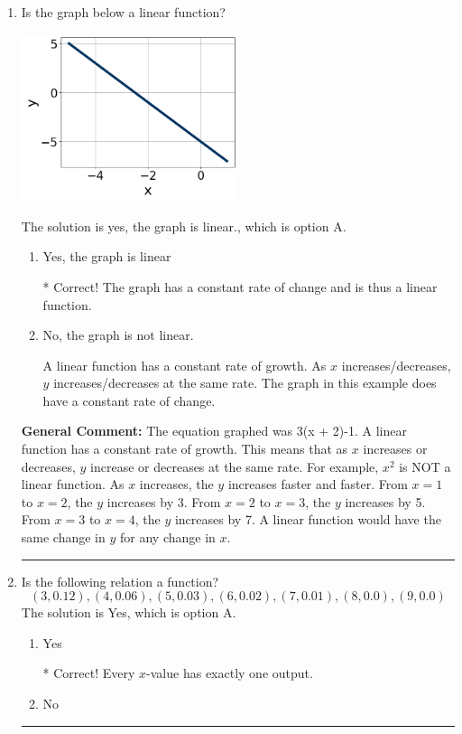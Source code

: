 \documentclass{extbook}[14pt]
\newcommand{\litem}[1]{\item #1

\rule{\textwidth}{0.4pt}}
\begin{document}
\begin{enumerate}\litem{
Is the graph below a linear function?

\begin{center}
    \includegraphics[width=0.5\textwidth]{../Figures/MA_8_F_1_2_graphD.png}
\end{center}


The solution is yes, the graph is linear., which is option A.

\begin{enumerate}[label=\Alph*.]
\item Yes, the graph is linear

* Correct! The graph has a constant rate of change and is thus a linear function.
\item No, the graph is not linear.

A linear function has a constant rate of growth. As $x$ increases/decreases, $y$ increases/decreases at the same rate. The graph in this example does have a constant rate of change.
\end{enumerate}


\textbf{General Comment:} The equation graphed was 3(x + 2)-1. A linear function has a constant rate of growth. This means that as $x$ increases or decreases, $y$ increase or decreases at the same rate. For example, $x^2$ is NOT a linear function. As $x$ increases, the $y$ increases faster and faster. From $x=1$ to $x=2$, the $y$ increases by 3. From $x=2$ to $x=3$, the $y$ increases by 5. From $x=3$ to $x=4$, the $y$ increases by 7. A linear function would have the same change in $y$ for any change in $x$.
}
\litem{
Is the following relation a function?
\[ (3, 0.12), (4, 0.06), (5, 0.03), (6, 0.02), (7, 0.01), (8, 0.0), (9, 0.0) \]The solution is Yes, which is option A.

\begin{enumerate}[label=\Alph*.]
\item Yes

* Correct! Every $x$-value has exactly one output.
\item No


\end{enumerate}}
\end{enumerate}
\end{document}
